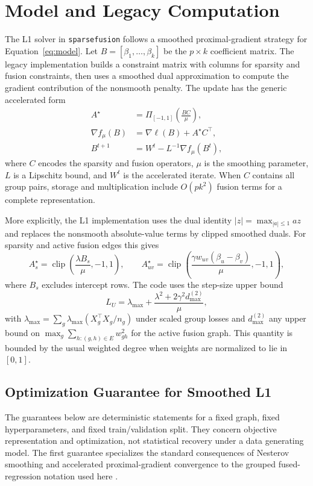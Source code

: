 \documentclass[twoside,11pt]{article}
\newcommand{\sparsefusion}{\texttt{sparsefusion}\xspace}
\DeclareMathOperator{\clip}{clip}
\begin{document}
\section{Model and Legacy Computation}

The L1 solver in \sparsefusion follows a smoothed proximal-gradient strategy for
Equation~\ref{eq:model}. Let $B=[\beta_1,\ldots,\beta_k]$ be the $p \times k$
coefficient matrix. The legacy implementation builds a constraint matrix with
columns for sparsity and fusion constraints, then uses a smoothed dual
approximation to compute the gradient contribution of the nonsmooth penalty.
The update has the generic accelerated form
\begin{align}
  A^\star &= \Pi_{[-1,1]}\left(\frac{B C}{\mu}\right),\\
  \nabla f_\mu(B) &= \nabla \ell(B) + A^\star C^\top,\\
  B^{t+1} &= W^t - L^{-1}\nabla f_\mu(B^t),
\end{align}
where $C$ encodes the sparsity and fusion operators, $\mu$ is the smoothing
parameter, $L$ is a Lipschitz bound, and $W^t$ is the accelerated iterate.
When $C$ contains all group pairs, storage and multiplication include
$O(pk^2)$ fusion terms for a complete representation.

More explicitly, the L1 implementation uses the dual identity
$|z|=\max_{|a|\leq 1} az$ and replaces the nonsmooth absolute-value terms by
clipped smoothed duals. For sparsity and active fusion edges this gives
\[
  A_s^\star = \clip\left(\frac{\lambda B_s}{\mu}, -1, 1\right),
  \qquad
  A_{uv}^\star =
  \clip\left(\frac{\gamma w_{uv}(\beta_u-\beta_v)}{\mu}, -1, 1\right),
\]
where $B_s$ excludes intercept rows. The code uses the step-size upper bound
\[
  L_U =
  \lambda_{\max}
  + \frac{\lambda^2+2\gamma^2 d_{\max}^{(2)}}{\mu},
\]
with $\lambda_{\max}=\sum_g \lambda_{\max}(X_g^\top X_g/n_g)$ under scaled
group losses and $d_{\max}^{(2)}$ any upper bound on
$\max_g\sum_{h:(g,h)\in E} w_{gh}^2$ for the active fusion graph. This
quantity is bounded by the usual weighted degree when weights are normalized
to lie in $[0,1]$.

\subsection{Optimization Guarantee for Smoothed L1}

The guarantees below are deterministic statements for a fixed graph, fixed
hyperparameters, and fixed train/validation split. They concern objective
representation and optimization, not statistical recovery under a data
generating model.
The first guarantee specializes the standard consequences of Nesterov
smoothing and accelerated proximal-gradient convergence to the grouped
fused-regression notation used here
\citep{nesterov2005smooth,beck2009fast}.
\end{document}
